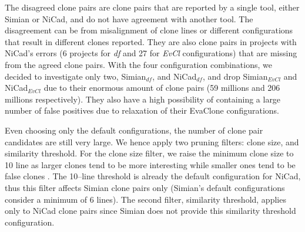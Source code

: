 \documentclass{sig-alternate-05-2015}
\begin{document}
The disagreed clone pairs are clone pairs that are reported by a single tool, either Simian or NiCad, and do not have agreement with another tool. The disagreement can be from misalignment of clone lines or different configurations that result in different clones reported. They are also clone pairs in projects with NiCad's errors (6 projects for \textit{df} and 27 for \textit{EvCl} configurations) that are missing from the agreed clone pairs. With the four configuration combinations, we decided to investigate only two, Simian$_{df}$, and NiCad$_{df}$, and drop Simian$_{\mathrm{\textit{EvCl}}}$ and NiCad$_{\mathrm{\textit{EvCl}}}$ due to their enormous amount of clone pairs (59 millions and 206 millions respectively). They also have a high possibility of containing a large number of false positives due to relaxation of their EvaClone configurations. 

Even choosing only the default configurations, the number of clone pair candidates are still very large. We hence apply two pruning filters: clone size, and similarity threshold. For the clone size filter, we raise the minimum clone size to 10 line as larger clones tend to be more interesting while smaller ones tend to be false clones \cite{Saini2016}. The 10--line threshold is already the default configuration for NiCad, thus this filter affects Simian clone pairs only (Simian's default configurations consider a minimum of 6 lines). The second filter, similarity threshold, applies only to NiCad clone pairs since Simian does not provide this similarity threshold configuration. %
\end{document}
